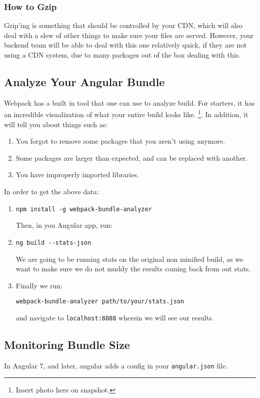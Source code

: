 \subsubsection{ How to Gzip }
Gzip'ing is something that should be controlled by your CDN, which will also 
deal with a slew of other things to make sure your files are served. However, 
your backend team will be able to deal with this one relatively quick, if they 
are not using a CDN system, due to many packages out of the box dealing with 
this. 

\subsection{Analyze Your Angular Bundle}
Webpack has a built in tool that one can use to analyze build. For starters, 
it has an incredible visualization of what your entire build looks like.
\footnote{Insert photo here on snapshot.}. In addition, it will tell you about 
things such as: 
\begin{enumerate}
  \item You forgot to remove some packages that you aren't using anymore.
  \item Some packages are larger than expected, and can be replaced with
  another.
  \item You have improperly imported libraries.
\end{enumerate}

In order to get the above data: 
\begin{enumerate}
\item 
\begin{verbatim}
npm install -g webpack-bundle-analyzer 
\end{verbatim}
Then, in you Angular app, run: 
\item 
\begin{verbatim}
ng build --stats-json
\end{verbatim}
We are going to be running stats on the original non minified build, as we 
want to make sure we do not muddy the results coming back from out stats. 
\item 
Finally we run: 
\begin{verbatim}
webpack-bundle-analyzer path/to/your/stats.json  
\end{verbatim}
and navigate to \lstinline{localhost:8888} wherein we will see our results.
\end{enumerate}

\subsection{Monitoring Bundle Size}
In Angular 7, and later, angular adds a config in your \lstinline{angular.json}
file. 






